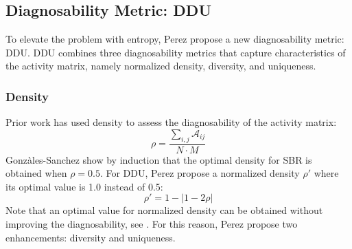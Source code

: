 \documentclass[twoside,a4paper,11pt]{memoir}
\begin{document}
\subsection{Diagnosability Metric: DDU}
To elevate the problem with entropy, Perez \etal \cite{DBLP:conf/icse/PerezAD17} propose a new diagnosability metric: DDU.
DDU combines three diagnosability metrics that capture characteristics of the activity matrix, namely normalized density, diversity, and uniqueness.

\subsubsection{Density}
Prior work \cite{5954476} has used density to assess the diagnosability of the activity matrix:
\begin{equation}
  \rho = \frac{\sum_{i,j}\mathcal{A}_{ij}}{N \cdot M}
\end{equation}
Gonz\`ales-Sanchez \etal \cite{5954476} show by induction that the optimal density for SBR is obtained when $\rho = 0.5$.
For DDU, Perez \etal \cite{DBLP:conf/icse/PerezAD17} propose a normalized density $\rho'$ where its optimal value is 1.0 instead of 0.5:
\begin{equation}
  \rho' = 1 - | 1 - 2 \rho |
\end{equation}
Note that an optimal value for normalized density can be obtained without improving the diagnosability, see .
For this reason, Perez \etal \cite{DBLP:conf/icse/PerezAD17} propose two enhancements: diversity and uniqueness.
\end{document}
